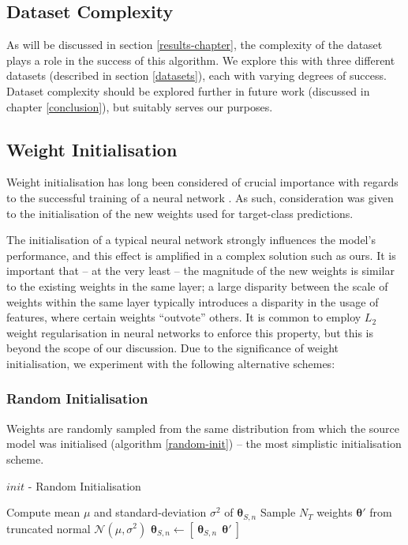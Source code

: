 \documentclass{report}
\begin{document}
\subsection{Dataset Complexity}
As will be discussed in section \ref{results-chapter}, the complexity of the dataset plays a role in the success of this algorithm. We explore this with three different datasets (described in section \ref{datasets}), each with varying degrees of success. Dataset complexity should be explored further in future work (discussed in chapter \ref{conclusion}), but suitably serves our purposes. \par

\subsection{Weight Initialisation} \label{weight-init}
Weight initialisation has long been considered of crucial importance with regards to the successful training of a neural network \parencite{heinit}\parencite{weightinit}. As such, consideration was given to the initialisation of the new weights used for target-class predictions. \par
The initialisation of a typical neural network strongly influences the model's performance, and this effect is amplified in a complex solution such as ours. It is important that -- at the very least -- the magnitude of the new weights is similar to the existing weights in the same layer; a large disparity between the scale of weights within the same layer typically introduces a disparity in the usage of features, where certain weights ``outvote'' others. It is common to employ $L_2$ weight regularisation in neural networks to enforce this property, but this is beyond the scope of our discussion. Due to the significance of weight initialisation, we experiment with the following alternative schemes:

\subsubsection{Random Initialisation}
Weights are randomly sampled from the same distribution from which the source model was initialised (algorithm \ref{random-init}) -- the most simplistic initialisation scheme.
\begin{algorithm}[h!]
	\label{alg:random-init}
	\caption{$init$ - Random Initialisation }
	\label{random-init}
	\begin{algorithmic}[1]
		\State Compute mean $\mu$ and standard-deviation $\sigma^2$ of $\bm{\theta}_{S,n}$
		\State Sample $N_T$ weights $\bm{\theta}'$ from truncated normal $\mathcal{N}(\mu, \sigma^2)$
		\State $\bm{\theta}_{S,n} \gets [~ \bm{\theta}_{S,n}~ ~ \bm{\theta}'~ ]$
	\end{algorithmic}
\end{algorithm}
\end{document}
